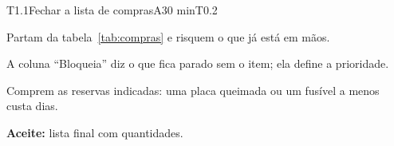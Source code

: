 \documentclass[11pt,a4paper]{article}
\begin{document}
\begin{tarefa}{T1.1}{Fechar a lista de compras}{A}{30 min}{T0.2}
\begin{passos}
  \item Partam da tabela~\ref{tab:compras} e risquem o que já está em mãos.
  \item A coluna ``Bloqueia'' diz o que fica parado sem o item; ela define a prioridade.
  \item Comprem as reservas indicadas: uma placa queimada ou um fusível a menos custa dias.
\end{passos}
\textbf{Aceite:} lista final com quantidades.
\end{tarefa}

\noindent\begin{minipage}{\linewidth}\label{tab:compras}\end{minipage}
\end{document}
